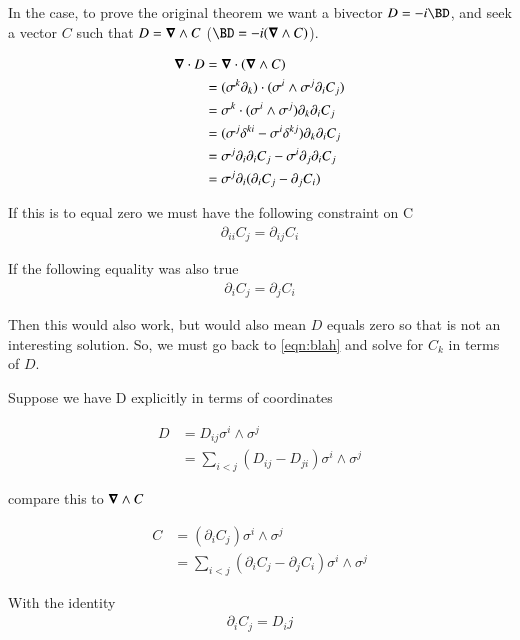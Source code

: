 \documentclass{article}
\begin{document}
In the  case, to prove the original theorem we want a bivector $D = -i\BD$, and seek a vector $C$ such that 
$D = \boldsymbol{\nabla} \wedge C$ ($\BD = -i (\spacegrad \wedge C)$).

\begin{align*}
\boldsymbol{\nabla} \cdot D 
&= \boldsymbol{\nabla} \cdot (\boldsymbol{\nabla} \wedge C) \\
&= (\sigma^k \partial_k) \cdot (\sigma^i \wedge \sigma^j \partial_i C_j) \\
&= \sigma^k \cdot (\sigma^i \wedge \sigma^j) \partial_k \partial_i C_j \\
&= ( \sigma^j \delta^{ki} - \sigma^i \delta^{kj} ) \partial_k \partial_i C_j \\
&= \sigma^j \partial_i \partial_i C_j - \sigma^i \partial_j \partial_i C_j \\
&= \sigma^j \partial_i (\partial_i C_j -\partial_j C_i) \\
\end{align*}

If this is to equal zero we must have the following constraint on C
\begin{align}\label{eqn:blah}
\partial_{ii} C_j = \partial_{ij} C_i
\end{align}

If the following equality was also true
\begin{align*}
\partial_{i} C_j = \partial_j C_i
\end{align*}

Then this would also work, but would also mean $D$ equals zero so that is not an interesting solution.  So, we must go back to
\ref{eqn:blah} and solve for $C_k$ in terms of $D$.

Suppose we have D explicitly in terms of coordinates

\begin{align*}
D 
&= D_{ij} \sigma^i \wedge \sigma^j \\
&= \sum_{i<j} (D_{ij} -D_{ji})\sigma^i \wedge \sigma^j
\end{align*}

compare this to $\boldsymbol{\nabla} \wedge C$

\begin{align*}
C &= (\partial_i C_j ) \sigma^i \wedge \sigma^j \\
  &= \sum_{i<j} (\partial_i C_j -\partial_j C_i) \sigma^i \wedge \sigma^j
\end{align*}

With the identity
\begin{align*}
\partial_i C_j = D_ij
\end{align*}
\end{document}
